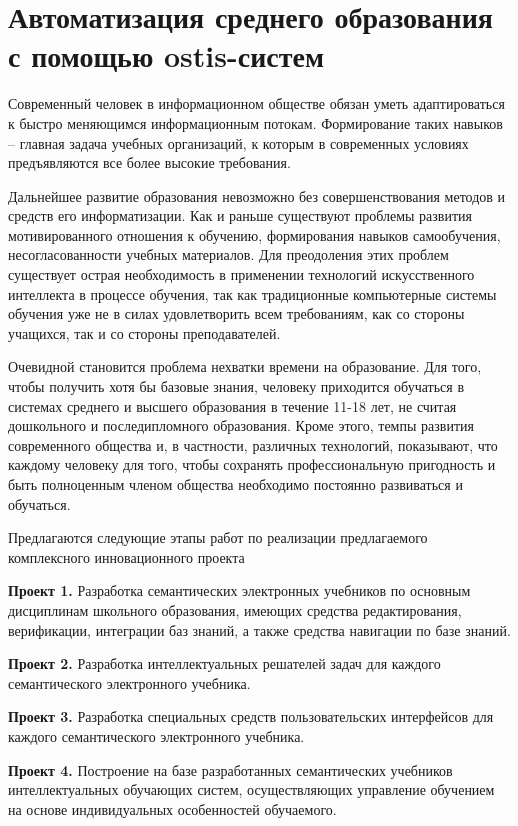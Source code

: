 \section{Автоматизация среднего образования с помощью ostis-систем}
\label{sec_automation_secondary_education}

Современный человек в информационном обществе обязан уметь адаптироваться к быстро меняющимся информационным потокам. Формирование таких навыков -- главная задача учебных организаций, к которым в современных условиях предъявляются все более высокие требования.

Дальнейшее развитие образования невозможно без совершенствования методов и средств его информатизации. Как и раньше существуют проблемы развития мотивированного отношения к обучению, формирования навыков самообучения, несогласованности учебных материалов. Для преодоления этих проблем существует острая необходимость в применении технологий искусственного интеллекта в процессе обучения, так как традиционные компьютерные системы обучения уже не в силах удовлетворить всем требованиям, как со стороны учащихся, так и со стороны преподавателей.

Очевидной становится проблема нехватки времени на образование. Для того, чтобы получить хотя бы базовые знания, человеку приходится обучаться в системах среднего и высшего образования в течение 11-18 лет, не считая дошкольного и последипломного образования. Кроме этого, темпы развития современного общества и, в частности, различных технологий, показывают, что каждому человеку для того, чтобы сохранять профессиональную пригодность и быть полноценным членом общества необходимо постоянно развиваться и обучаться.

Предлагаются следующие этапы работ по реализации предлагаемого комплексного инновационного проекта

\textbf{Проект 1.} Разработка семантических электронных учебников по основным дисциплинам школьного образования, имеющих средства редактирования, верификации, интеграции баз знаний, а также средства навигации по базе знаний.

\textbf{Проект 2.} Разработка интеллектуальных решателей задач для каждого семантического электронного учебника.

\textbf{Проект 3.} Разработка специальных средств пользовательских интерфейсов для каждого семантического электронного учебника.

\textbf{Проект 4.} Построение на базе разработанных семантических учебников интеллектуальных обучающих систем, осуществляющих управление обучением на основе индивидуальных особенностей обучаемого.

